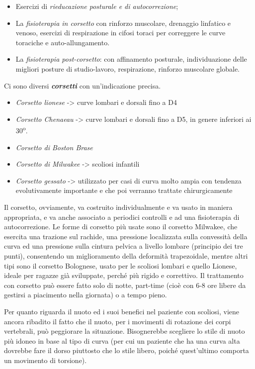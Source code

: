 \begin{itemize}
\item
  Esercizi di \emph{rieducazione posturale e di autocorrezione};
\item
  La \emph{fisioterapia in corsetto} con rinforzo muscolare, drenaggio
  linfatico e venoso, esercizi di respirazione in cifosi toraci per
  correggere le curve toraciche e auto-allungamento.
\item
  La \emph{fisioterapia post-corsetto}: con affinamento posturale,
  individuazione delle migliori posture di studio-lavoro, respirazione,
  rinforzo muscolare globale.
\end{itemize}

Ci sono diversi \textbf{\emph{corsetti}} con un'indicazione precisa.

\begin{itemize}
\item
  \emph{Corsetto lionese} -> curve lombari e dorsali fino a D4
\item
  \emph{Corsetto Chenaeau} -> curve lombari e dorsali fino a D5, in
  genere inferiori ai 30\textsuperscript{o}.
\item
  \emph{Corsetto di Boston Brase}
\item
  \emph{Corsetto di Milwakee} -> scoliosi infantili
\item
  \emph{Corsetto gessato} -> utilizzato per casi di curva molto ampia con
  tendenza evolutivamente importante e che poi verranno trattate
  chirurgicamente
\end{itemize}

Il corsetto, ovviamente, va costruito individualmente e va usato in
maniera appropriata, e va anche associato a periodici controlli e ad una
fisioterapia di autocorrezione. Le forme di corsetto più usate sono il
corsetto Milwakee, che esercita una trazione sul rachide, una pressione
localizzata sulla convessità della curva ed una pressione sulla cintura
pelvica a livello lombare (principio dei tre punti), consentendo un
miglioramento della deformità trapezoidale, mentre altri tipi sono il
corsetto Bolognese, usato per le scoliosi lombari e quello Lionese,
ideale per ragazze già sviluppate, perché più rigido e correttivo. Il
trattamento con corsetto può essere fatto solo di notte, part-time (cioè
con 6-8 ore libere da gestirsi a piacimento nella giornata) o a tempo
pieno.

Per quanto riguarda il nuoto ed i suoi benefici nel paziente con
scoliosi, viene ancora ribadito il fatto che il nuoto, per i movimenti
di rotazione dei corpi vertebrali, può peggiorare la situazione.
Bisognerebbe scegliere lo stile di nuoto più idoneo in base al tipo di
curva (per cui un paziente che ha una curva alta dovrebbe fare il dorso
piuttosto che lo stile libero, poiché quest'ultimo comporta un movimento
di torsione).

